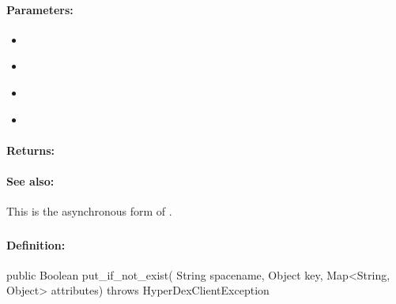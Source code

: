 \paragraph{Parameters:}
\begin{itemize}[noitemsep]
\item {}\\

\item {}\\

\item {}\\

\item {}\\

\end{itemize}

\paragraph{Returns:}


\paragraph{See also:}  This is the asynchronous form of .

\pagebreak
\subsubsection{}
\label{api:java:put_if_not_exist}


\paragraph{Definition:}
\begin{javacode}
public Boolean put_if_not_exist(
        String spacename,
        Object key,
        Map<String, Object> attributes) throws HyperDexClientException
\end{javacode}

